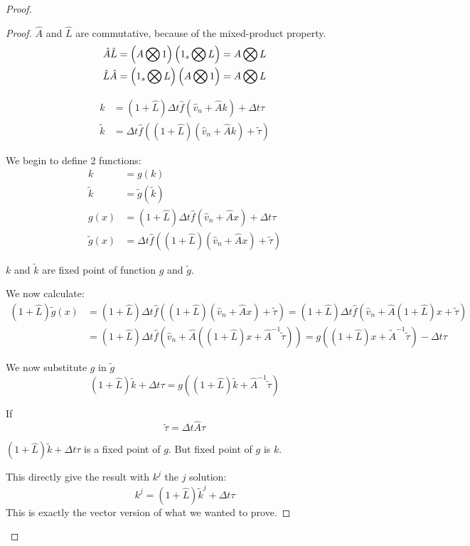 \begin{proof}
\begin{proof}
$\hat{A}$ and $\hat{L}$ are commutative, because of the mixed-product property.
\begin{align}
\hat{A}\hat{L}&=\left(A\bigotimes 1 \right)
  \left(1_{s}\bigotimes L\right)=
	A\bigotimes L\\
    \hat{L}\hat{A}&=
  \left(1_{s}\bigotimes L\right)
	\left(A \bigotimes 1 \right)=
	A\bigotimes L
\end{align}

\begin{align}
k&=(1+\hat{L})\Delta t\hat{f}(\hat{v}_{n}+\hat{A}k)+\Delta t\tau\\
\tilde{k}&=\Delta t \hat{f}((1+\hat{L})(\hat{v}_{n}+\hat{A}k)+\tilde{\tau})
\end{align}

We begin to define 2 functions:
\begin{align}
k&=g(k)\\
\tilde{k}&=\tilde{g}(\tilde{k})\\
g(x)&=(1+\hat{L})\Delta t \hat{f}(\hat{v}_{n}+\hat{A}x)+\Delta t\tau\\
\tilde{g}(x)&=\Delta t \hat{f}((1+\hat{L})(\hat{v}_{n}+\hat{A}x)+\tilde{\tau})
\end{align}

$k$ and $\tilde{k}$ are fixed point of function $g$ and $\tilde{g}$.

We now calculate:
\begin{align}
(1+\hat{L})\tilde{g}(x)&=(1+\hat{L})\Delta t \hat{f}((1+\hat{L})(\hat{v}_{n}+\hat{A}x)+\tilde{\tau})=(1+\hat{L})\Delta t \hat{f}(\hat{v}_{n}+\hat{A} (1+\hat{L})x+\tilde{\tau})\\
&=(1+\hat{L})\Delta t \hat{f}(\hat{v}_{n}+\hat{A} ((1+\hat{L})x+\hat{A}^{-1}\tilde{\tau}))=g((1+\hat{L})x+\tilde{A}^{-1}\tilde{\tau})-\Delta t \tau
\end{align}

We now substitute $g$ in $\tilde{g}$
\begin{equation}
(1+\hat{L})\tilde{k}+\Delta t \tau=g((1+\hat{L})\tilde{k}+\hat{A}^{-1}\tilde{\tau})
\end{equation}

If
\begin{equation}
  \tilde{\tau}=\Delta t \hat{A}\tau
\end{equation}

$(1+\hat{L})\tilde{k}+\Delta t \tau$ is a fixed point of $g$.
But fixed point of $g$ is $k$.

This directly give the result with $k^{j}$ the $j$ solution:
\begin{equation}
k^{j}=(1+\hat{L})\tilde{k}^{j}+\Delta t \tau
\end{equation}
This is exactly the vector version of what we wanted to prove.
\end{proof}


\end{proof}
